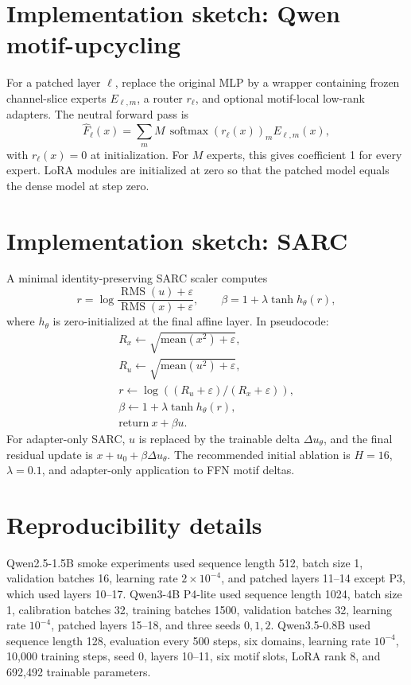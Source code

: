 \documentclass[11pt]{article}
\theoremstyle{definition}
\newcommand{\softmax}{\operatorname{softmax}}
\newcommand{\RMS}{\operatorname{RMS}}
\begin{document}
\section{Implementation sketch: Qwen motif-upcycling}

For a patched layer \(\ell\), replace the original MLP by a wrapper containing frozen channel-slice experts \(E_{\ell,m}\), a router \(r_\ell\), and optional motif-local low-rank adapters. The neutral forward pass is
\[
\widehat F_\ell(x)=\sum_m M\,\softmax(r_\ell(x))_mE_{\ell,m}(x),
\]
with \(r_\ell(x)=0\) at initialization. For \(M\) experts, this gives coefficient 1 for every expert. LoRA modules are initialized at zero so that the patched model equals the dense model at step zero.


\section{Implementation sketch: SARC}

A minimal identity-preserving SARC scaler computes
\[
r=\log\frac{\RMS(u)+\varepsilon}{\RMS(x)+\varepsilon},
\qquad
\beta=1+\lambda\tanh h_\theta(r),
\]
where \(h_\theta\) is zero-initialized at the final affine layer. In pseudocode:
\[
\begin{array}{l}
R_x\leftarrow \sqrt{\mathrm{mean}(x^2)+\varepsilon},\\
R_u\leftarrow \sqrt{\mathrm{mean}(u^2)+\varepsilon},\\
r\leftarrow \log((R_u+\varepsilon)/(R_x+\varepsilon)),\\
\beta\leftarrow 1+\lambda\tanh h_\theta(r),\\
\mathrm{return}\ x+\beta u.
\end{array}
\]
For adapter-only SARC, \(u\) is replaced by the trainable delta \(\Delta u_\theta\), and the final residual update is \(x+u_0+\beta\Delta u_\theta\). The recommended initial ablation is \(H=16\), \(\lambda=0.1\), and adapter-only application to FFN motif deltas.

\section{Reproducibility details}

Qwen2.5-1.5B smoke experiments used sequence length 512, batch size 1, validation batches 16, learning rate \(2\times10^{-4}\), and patched layers 11--14 except P3, which used layers 10--17. Qwen3-4B P4-lite used sequence length 1024, batch size 1, calibration batches 32, training batches 1500, validation batches 32, learning rate \(10^{-4}\), patched layers 15--18, and three seeds \(0,1,2\). Qwen3.5-0.8B used sequence length 128, evaluation every 500 steps, six domains, learning rate \(10^{-4}\), 10,000 training steps, seed 0, layers 10--11, six motif slots, LoRA rank 8, and 692,492 trainable parameters.
\end{document}
